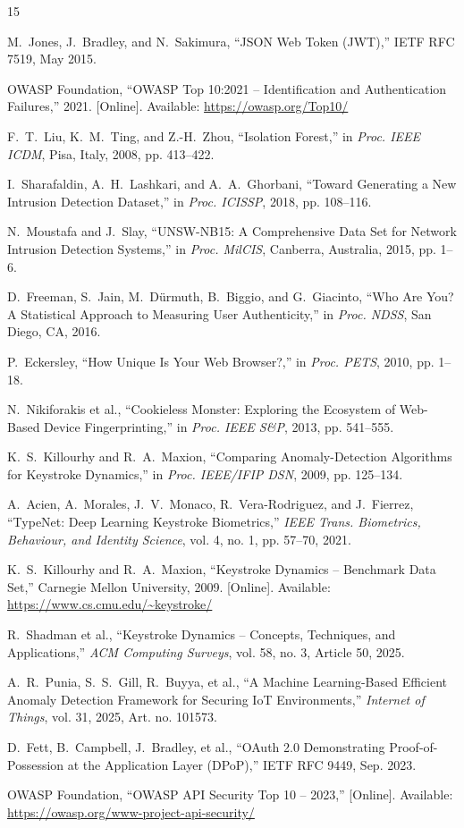 \documentclass[conference]{IEEEtran}
\begin{document}
\begin{thebibliography}{15}

M.~Jones, J.~Bradley, and N.~Sakimura, ``JSON Web Token (JWT),'' IETF RFC 7519, May 2015.

OWASP Foundation, ``OWASP Top 10:2021 -- Identification and Authentication Failures,'' 2021. [Online]. Available: \url{https://owasp.org/Top10/}

F.~T.~Liu, K.~M.~Ting, and Z.-H.~Zhou, ``Isolation Forest,'' in \emph{Proc. IEEE ICDM}, Pisa, Italy, 2008, pp. 413--422.

I.~Sharafaldin, A.~H.~Lashkari, and A.~A.~Ghorbani, ``Toward Generating a New Intrusion Detection Dataset,'' in \emph{Proc. ICISSP}, 2018, pp. 108--116.

N.~Moustafa and J.~Slay, ``UNSW-NB15: A Comprehensive Data Set for Network Intrusion Detection Systems,'' in \emph{Proc. MilCIS}, Canberra, Australia, 2015, pp. 1--6.

D.~Freeman, S.~Jain, M.~D{\"u}rmuth, B.~Biggio, and G.~Giacinto, ``Who Are You? A Statistical Approach to Measuring User Authenticity,'' in \emph{Proc. NDSS}, San Diego, CA, 2016.

P.~Eckersley, ``How Unique Is Your Web Browser?,'' in \emph{Proc. PETS}, 2010, pp. 1--18.

N.~Nikiforakis et al., ``Cookieless Monster: Exploring the Ecosystem of Web-Based Device Fingerprinting,'' in \emph{Proc. IEEE S\&P}, 2013, pp. 541--555.

K.~S.~Killourhy and R.~A.~Maxion, ``Comparing Anomaly-Detection Algorithms for Keystroke Dynamics,'' in \emph{Proc. IEEE/IFIP DSN}, 2009, pp. 125--134.

A.~Acien, A.~Morales, J.~V.~Monaco, R.~Vera-Rodriguez, and J.~Fierrez, ``TypeNet: Deep Learning Keystroke Biometrics,'' \emph{IEEE Trans. Biometrics, Behaviour, and Identity Science}, vol. 4, no. 1, pp. 57--70, 2021.

K.~S.~Killourhy and R.~A.~Maxion, ``Keystroke Dynamics -- Benchmark Data Set,'' Carnegie Mellon University, 2009. [Online]. Available: \url{https://www.cs.cmu.edu/~keystroke/}

R.~Shadman et al., ``Keystroke Dynamics -- Concepts, Techniques, and Applications,'' \emph{ACM Computing Surveys}, vol. 58, no. 3, Article 50, 2025.

A.~R.~Punia, S.~S.~Gill, R.~Buyya, et al., ``A Machine Learning-Based Efficient Anomaly Detection Framework for Securing IoT Environments,'' \emph{Internet of Things}, vol. 31, 2025, Art. no. 101573.

D.~Fett, B.~Campbell, J.~Bradley, et al., ``OAuth 2.0 Demonstrating Proof-of-Possession at the Application Layer (DPoP),'' IETF RFC 9449, Sep. 2023.

OWASP Foundation, ``OWASP API Security Top 10 -- 2023,'' [Online]. Available: \url{https://owasp.org/www-project-api-security/}

\end{thebibliography}
\end{document}
